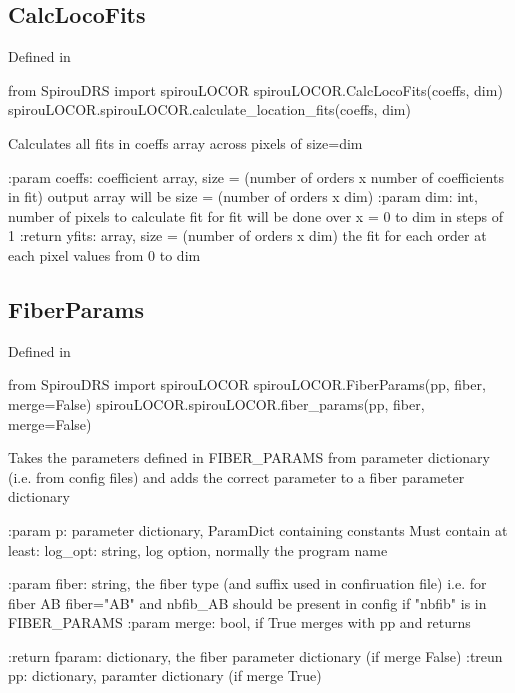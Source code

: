 \begin{minipage}{\textwidth}
\subsection{CalcLocoFits}

Defined in \spirouLOCOR{}

\begin{pythonbox}
from SpirouDRS import spirouLOCOR
spirouLOCOR.CalcLocoFits(coeffs, dim)
spirouLOCOR.spirouLOCOR.calculate_location_fits(coeffs, dim)
\end{pythonbox}

\begin{pythondocstring}
Calculates all fits in coeffs array across pixels of size=dim

:param coeffs: coefficient array,
               size = (number of orders x number of coefficients in fit)
               output array will be size = (number of orders x dim)
:param dim: int, number of pixels to calculate fit for
            fit will be done over x = 0 to dim in steps of 1
:return yfits: array,
               size = (number of orders x dim)
               the fit for each order at each pixel values from 0 to dim
\end{pythondocstring}
\end{minipage}

\begin{minipage}{\textwidth}
\subsection{FiberParams}

Defined in \spirouLOCOR{}

\begin{pythonbox}
from SpirouDRS import spirouLOCOR
spirouLOCOR.FiberParams(pp, fiber, merge=False)
spirouLOCOR.spirouLOCOR.fiber_params(pp, fiber, merge=False)
\end{pythonbox}

\begin{pythondocstring}
Takes the parameters defined in FIBER_PARAMS from parameter dictionary
(i.e. from config files) and adds the correct parameter to a fiber
parameter dictionary

:param p: parameter dictionary, ParamDict containing constants
    Must contain at least:
            log_opt: string, log option, normally the program name

:param fiber: string, the fiber type (and suffix used in confiruation file)
              i.e. for fiber AB fiber="AB" and nbfib_AB should be present
              in config if "nbfib" is in FIBER_PARAMS
:param merge: bool, if True merges with pp and returns

:return fparam: dictionary, the fiber parameter dictionary (if merge False)
:treun pp: dictionary, paramter dictionary (if merge True)
\end{pythondocstring}
\end{minipage}

